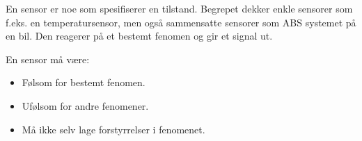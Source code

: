 En sensor er noe som spesifiserer en tilstand.
Begrepet dekker enkle sensorer som f.eks. en temperatursensor, men også
sammensatte sensorer som ABS systemet på en bil.
Den reagerer på et bestemt fenomen og gir et signal ut.

En sensor må være:
\begin{itemize}
  \item Følsom for bestemt fenomen.
  \item Ufølsom for andre fenomener.
  \item Må ikke selv lage forstyrrelser i fenomenet.
\end{itemize}
